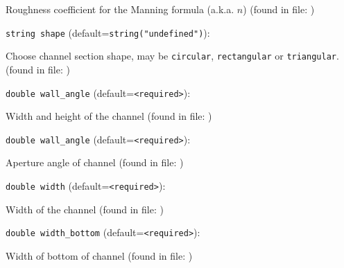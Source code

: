 Roughness coefficient for the Manning formula (a.k.a. $n$)
 (found in file: \verb++)
\item\verb+string shape+ {\rm(default=\verb|string("undefined")|)}:

Choose channel section shape, may be {\tt circular},
 {\tt rectangular} or {\tt triangular}.
 (found in file: \verb++)
\item\verb+double wall_angle+ {\rm(default=\verb|<required>|)}:

Width and height of the channel
 (found in file: \verb++)
\item\verb+double wall_angle+ {\rm(default=\verb|<required>|)}:

Aperture angle of channel
 (found in file: \verb++)
\item\verb+double width+ {\rm(default=\verb|<required>|)}:

Width of the channel
 (found in file: \verb++)
\item\verb+double width_bottom+ {\rm(default=\verb|<required>|)}:

Width of bottom of channel
 (found in file: \verb++)
